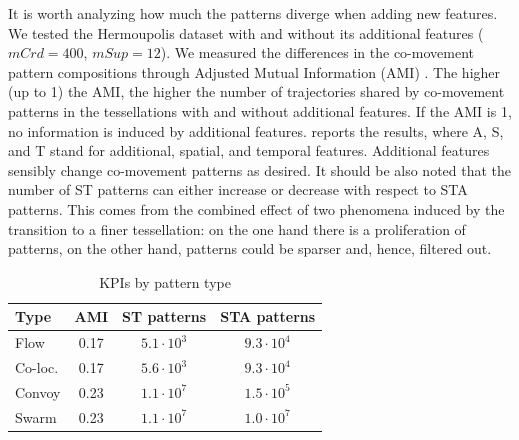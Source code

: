 \documentclass[preprint,12pt,authoryear]{elsarticle} %
\renewcommand{\sf}[1]{\textsf{\textup{#1}}}
\begin{document}
It is worth analyzing how much the patterns diverge when adding new features.
We tested the \sf{Hermoupolis} dataset with and without its additional features ($mCrd=400$, $mSup=12$).
We measured the differences in the co-movement pattern compositions through Adjusted Mutual Information (AMI) \citep{vinh2010information}.
The higher (up to 1) the AMI, the higher the number of trajectories shared by co-movement patterns in the tessellations with and without additional features.
If the AMI is 1, no information is induced by additional features.
 reports the results, where A, S, and T stand for additional, spatial, and temporal features.
Additional features sensibly change co-movement patterns as desired.
It should be also noted that the number of ST patterns can either increase or decrease with respect to STA patterns.
This comes from the combined effect of two phenomena induced by the transition to a finer tessellation: on the one hand there is a proliferation of patterns, on the other hand, patterns could be sparser and, hence, filtered out.



\begin{table}[t]
\centering
\footnotesize
\caption{KPIs by pattern type}
\label{tab:ami}%
\begin{tabular}{lccc}
\toprule
Type    & AMI  & ST patterns & STA patterns\\
\midrule
Flow    & 0.17 & $5.1\cdot10^{3}$ & $9.3 \cdot 10^4$ \\
Co-loc. & 0.17 & $5.6\cdot10^{3}$ & $9.3 \cdot 10^4$ \\
Convoy  & 0.23 & $1.1\cdot10^{7}$ & $1.5 \cdot 10^5$ \\
Swarm   & 0.23 & $1.1\cdot10^{7}$ & $1.0 \cdot 10^7$ \\
\bottomrule
\end{tabular}%
\end{table}%
\end{document}
